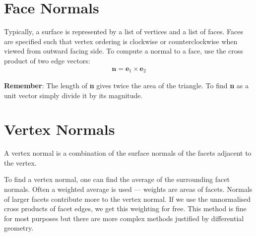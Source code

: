 \documentclass{article}
\begin{document}
\section{Face Normals}
Typically, a surface is represented by a list of vertices and a list of faces.
Faces are specified such that vertex ordering is clockwise or counterclockwise when viewed from outward facing side.
To compute a normal to a face, use the cross product of two edge vectors:
\begin{align*}
	\textbf{n} = \textbf{e}_1 \times \textbf{e}_2
\end{align*}

\textbf{Remember}: The length of \textbf{n} gives twice the area of the triangle.
To find \textbf{n} as a unit vector simply divide it by its magnitude.

\section{Vertex Normals}
A vertex normal is a combination of the surface normals of the facets adjacent to the vertex.

To find a vertex normal, one can find the average of the surrounding facet normals.
Often a weighted average is used --- weights are areas of facets.
Normals of larger facets contribute more to the vertex normal.
If we use the unnormalised cross products of facet edges, we get this weighting for free.
This method is fine for most purposes but there are more complex methods justified by differential geometry.
\end{document}
